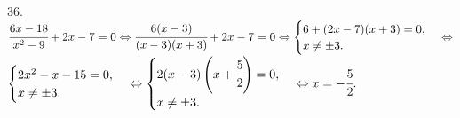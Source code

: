 36. $\cfrac{6x-18}{x^2-9}+2x-7=0\Leftrightarrow\cfrac{6(x-3)}{(x-3)(x+3)}+2x-7=0\Leftrightarrow\begin{cases}
6+(2x-7)(x+3)=0,\\
x\neq\pm3.\end{cases}\Leftrightarrow$\\$\begin{cases}
2x^2-x-15=0,\\
x\neq\pm3.\end{cases}\Leftrightarrow\begin{cases}
2(x-3)\left(x+\cfrac{5}{2}\right)=0,\\
x\neq\pm3.\end{cases}\Leftrightarrow x=-\cfrac{5}{2}.$\\

